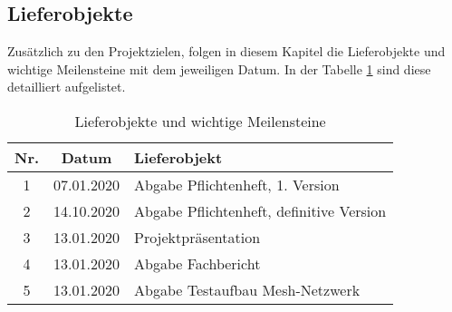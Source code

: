 \clearpage
\subsection{Lieferobjekte}\label{subsec:Lieferobjekte}
Zusätzlich zu den Projektzielen, folgen in diesem Kapitel die Lieferobjekte und wichtige Meilensteine mit dem jeweiligen Datum. In der Tabelle \ref{tbl:Lieferobjekte} sind diese detailliert aufgelistet.  


\begin{table}[H]
     \centering
\begin{tabular}{|c|c|l|}\hline
   \textbf{Nr.} & \textbf{Datum} & \textbf{Lieferobjekt} \\ \hline
   
   1 & 07.01.2020 & Abgabe Pflichtenheft, 1. Version\\ \hline
   2 & 14.10.2020 & Abgabe Pflichtenheft, definitive Version\\ \hline
   3 & 13.01.2020 & Projektpräsentation \\ \hline
   4 & 13.01.2020 & Abgabe Fachbericht \\ \hline
   5 & 13.01.2020 & Abgabe Testaufbau Mesh-Netzwerk \\ \hline
   
   
   
 \end{tabular}
     \caption{Lieferobjekte und wichtige Meilensteine}
     \label{tbl:Lieferobjekte}
\end{table}









